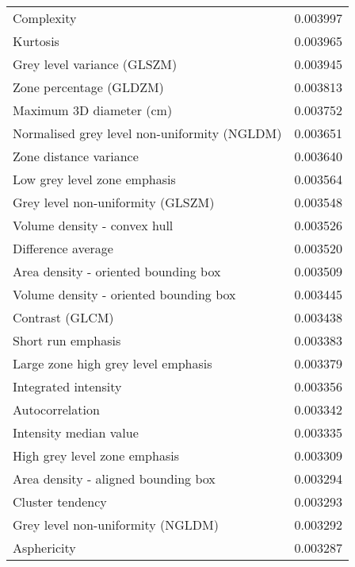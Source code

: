 \begin{tabular}{lr}
Complexity                                         &        0.003997 \\
Kurtosis                                           &        0.003965 \\
Grey level variance (GLSZM)                        &        0.003945 \\
Zone percentage (GLDZM)                            &        0.003813 \\
Maximum 3D diameter (cm)                           &        0.003752 \\
Normalised grey level non-uniformity (NGLDM)       &        0.003651 \\
Zone distance variance                             &        0.003640 \\
Low grey level zone emphasis                       &        0.003564 \\
Grey level non-uniformity (GLSZM)                  &        0.003548 \\
Volume density - convex hull                       &        0.003526 \\
Difference average                                 &        0.003520 \\
Area density - oriented bounding box               &        0.003509 \\
Volume density - oriented bounding box             &        0.003445 \\
Contrast (GLCM)                                    &        0.003438 \\
Short run emphasis                                 &        0.003383 \\
Large zone high grey level emphasis                &        0.003379 \\
Integrated intensity                               &        0.003356 \\
Autocorrelation                                    &        0.003342 \\
Intensity median value                             &        0.003335 \\
High grey level zone emphasis                      &        0.003309 \\
Area density - aligned bounding box                &        0.003294 \\
Cluster tendency                                   &        0.003293 \\
Grey level non-uniformity (NGLDM)                  &        0.003292 \\
Asphericity                                        &        0.003287 \\

\end{tabular}
